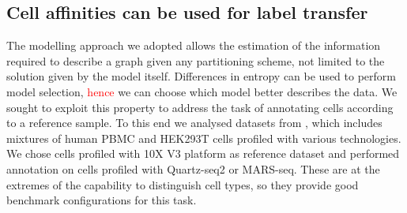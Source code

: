 \documentclass[10pt]{article}
\begin{document}

\subsection*{Cell affinities can be used for label transfer}

The modelling approach we adopted allows the estimation of the information required to describe a graph given any partitioning scheme, not limited to the solution given by the model itself. Differences in entropy can be used to perform model selection, \textcolor{red}{hence} we can choose which model better describes the data. We sought to exploit this property to address the task of annotating cells according to a reference sample. To this end we analysed datasets from \cite{mereu_2020}, which includes mixtures of human PBMC and HEK293T cells profiled with various technologies. We chose cells profiled with 10X V3 platform as reference dataset and performed annotation on cells profiled with Quartz-seq2 or MARS-seq. These are at the extremes of the capability to distinguish cell types, so they provide good benchmark configurations for this task. 
\end{document}
